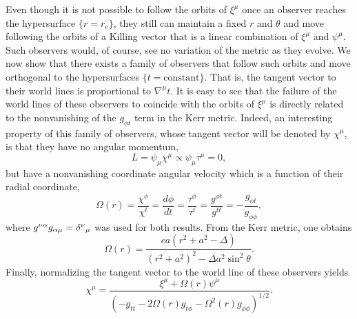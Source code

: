 \documentclass[
12pt,		%
openright,	%
twoside,  %
a4paper,			%
chapter=TITLE,		%
english,			%
french,				%
spanish,			%
brazil				%
]{USPSC-classe/USPSC}
\begin{document}
Even though it is not possible to follow the orbits of $\xi^{\mu}$ once an observer reaches the hypersurface $\{r=r_e\}$, they still can maintain a fixed $r$ and $\theta$ and move following the orbits of a Killing vector that is a linear combination of $\xi^{\mu}$ and $\psi^{\mu}$. Such observers would, of course, see no variation of the metric as they evolve. We now show that there exists a family of observers that follow such orbits and move orthogonal to the hypersurfaces $\{t=\text{constant}\}$. That is, the tangent vector to their world lines is proportional to $\nabla^{\mu}t$. It is easy to see that the failure of the world lines of these observers to coincide with the orbits of $\xi^{\mu}$ is directly related to the nonvanishing of the $g_{\phi t}$ term in the Kerr metric. Indeed, an interesting property of this family of observers, whose tangent vector will be denoted by $\chi^{\mu}$, is that they have no angular momentum,
\begin{equation}
    L=\psi_{\mu}\chi^{\mu}\propto\psi_{\mu}\tau^{\mu}=0,
\end{equation}
but have a nonvanishing coordinate angular velocity which is a function of their radial coordinate,
\begin{equation}
    \Omega(r)=\frac{\chi^{\phi}}{\chi^t}=\frac{d\phi}{dt}=\frac{\tau^{\phi}}{\tau^{t}}=\frac{g^{\phi t}}{g^{tt}}=-\frac{g_{\phi t}}{g_{\phi\phi}},
\end{equation}
where $g^{\nu\alpha}g_{\alpha\mu}=\delta^{\nu}\mathstrut_{\mu}$ was used for both results. From the Kerr metric, one obtains
\begin{equation}\label{angularv}
    \Omega(r)=\frac{ca(r^2+a^2-\Delta)}{(r^2+a^2)^2-\Delta a^2\sin^2{\theta}}.
\end{equation}
Finally, normalizing the tangent vector to the world line of these observers yields
\begin{equation}\label{tangentobs}
    \chi^{\mu}=\frac{\xi^{\mu}+\Omega(r)\psi^{\mu}}{\left(-g_{tt}-2\Omega(r) g_{t\phi}-\Omega^2(r) g_{\phi\phi}\right)^{1/2}}.
\end{equation}
\end{document}
